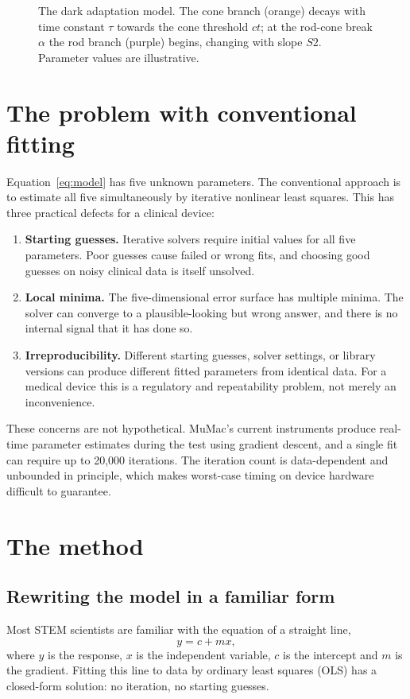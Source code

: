 \documentclass[11pt,a4paper]{article}
\begin{document}
\begin{figure}[ht]
\centering

\caption{The dark adaptation model. The cone branch (orange) decays with
time constant $\tau$ towards the cone threshold $ct$; at the rod-cone
break $\alpha$ the rod branch (purple) begins, changing with slope $S2$.
Parameter values are illustrative.}
\label{fig:model}
\end{figure}

\section{The problem with conventional fitting}
Equation~\eqref{eq:model} has five unknown parameters. The conventional
approach is to estimate all five simultaneously by iterative nonlinear
least squares. This has three practical defects for a clinical device:
\begin{enumerate}[nosep]
\item \textbf{Starting guesses.} Iterative solvers require initial values
  for all five parameters. Poor guesses cause failed or wrong fits, and
  choosing good guesses on noisy clinical data is itself unsolved.
\item \textbf{Local minima.} The five-dimensional error surface has
  multiple minima. The solver can converge to a plausible-looking but
  wrong answer, and there is no internal signal that it has done so.
\item \textbf{Irreproducibility.} Different starting guesses, solver
  settings, or library versions can produce different fitted parameters
  from identical data. For a medical device this is a regulatory and
  repeatability problem, not merely an inconvenience.
\end{enumerate}
These concerns are not hypothetical. MuMac's current instruments produce
real-time parameter estimates during the test using gradient descent, and
a single fit can require up to 20{,}000 iterations. The iteration count
is data-dependent and unbounded in principle, which makes worst-case
timing on device hardware difficult to guarantee.

\section{The method}
\subsection{Rewriting the model in a familiar form}
Most STEM scientists are familiar with the equation of a straight line,
\begin{equation}
y = c + mx,
\end{equation}
where $y$ is the response, $x$ is the independent variable, $c$ is the
intercept and $m$ is the gradient. Fitting this line to data by ordinary
least squares (OLS) has a closed-form solution: no iteration, no starting
guesses.
\end{document}
